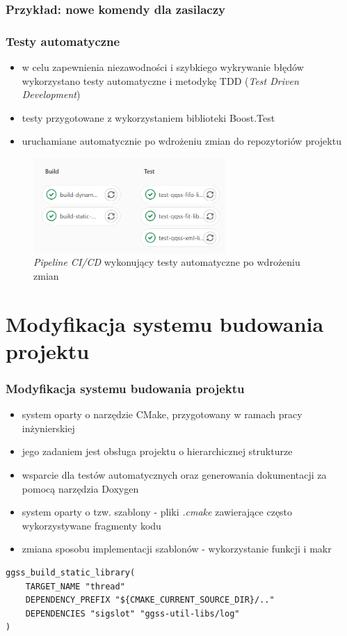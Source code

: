 \documentclass[10pt]{beamer}
\begin{document}
\begin{frame}
\frametitle{Przykład: nowe komendy dla zasilaczy}
\end{frame}

\begin{frame}
\frametitle{Testy automatyczne}
\begin{itemize}
    \item w celu zapewnienia niezawodności i szybkiego wykrywanie błędów wykorzystano testy automatyczne i metodykę TDD (\emph{Test Driven Development})
    \item testy przygotowane z wykorzystaniem biblioteki Boost.Test
    \item uruchamiane automatycznie po wdrożeniu zmian do repozytoriów projektu
\end{itemize}
\begin{figure}
\includegraphics[width=0.65\textwidth]{static/pipeline.png}
\caption{\emph{Pipeline CI/CD} wykonujący testy automatyczne po wdrożeniu zmian}
\end{figure}
\end{frame}


\section{Modyfikacja systemu budowania projektu}

\begin{frame}[fragile]
\frametitle{Modyfikacja systemu budowania projektu}
\begin{itemize}
    \item system oparty o narzędzie CMake, przygotowany w ramach pracy inżynierskiej
    \item jego zadaniem jest obsługa projektu o hierarchicznej strukturze
    \item wsparcie dla testów automatycznych oraz generowania dokumentacji za pomocą narzędzia Doxygen
    \item system oparty o tzw. szablony - pliki \emph{.cmake} zawierające często wykorzystywane fragmenty kodu
    \item zmiana sposobu implementacji szablonów - wykorzystanie funkcji i makr
\end{itemize}
\begin{lstlisting}[caption={}]
ggss_build_static_library(
    TARGET_NAME "thread"
    DEPENDENCY_PREFIX "${CMAKE_CURRENT_SOURCE_DIR}/.."
    DEPENDENCIES "sigslot" "ggss-util-libs/log"
)
\end{lstlisting}
\end{frame}
\end{document}
